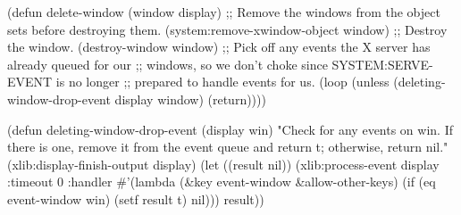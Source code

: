 \begin{lisp}
(defun delete-window (window display)
  ;; Remove the windows from the object sets before destroying them.
  (system:remove-xwindow-object window)
  ;; Destroy the window.
  (destroy-window window)
  ;; Pick off any events the X server has already queued for our
  ;; windows, so we don't choke since SYSTEM:SERVE-EVENT is no longer
  ;; prepared to handle events for us.
  (loop
   (unless (deleting-window-drop-event display window)
     (return))))

(defun deleting-window-drop-event (display win)
  "Check for any events on win.  If there is one, remove it from the
   event queue and return t; otherwise, return nil."
  (xlib:display-finish-output display)
  (let ((result nil))
    (xlib:process-event
     display :timeout 0
     :handler #'(lambda (&key event-window &allow-other-keys)
                  (if (eq event-window win)
                      (setf result t)
                      nil)))
    result))
\end{lisp}
